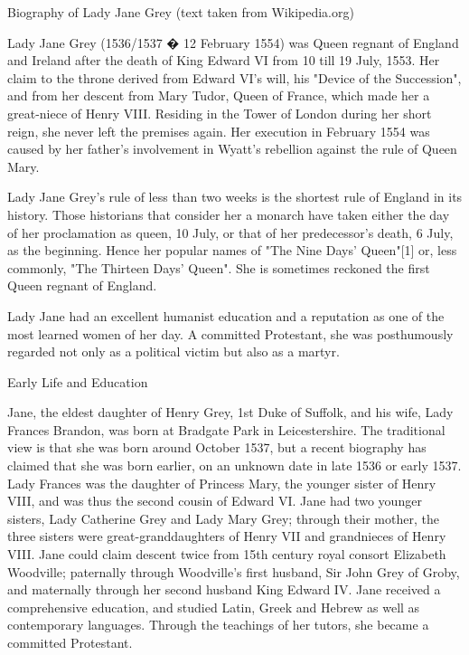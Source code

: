 \documentclass{article}
\begin{document}
Biography of Lady Jane Grey 
(text taken from Wikipedia.org)


Lady Jane Grey (1536/1537 � 12 February 1554) was Queen regnant of England and Ireland after the death of King Edward VI from 10 till 19 July, 1553. Her claim to the throne derived from Edward VI's will, his "Device of the Succession", and from her descent from Mary Tudor, Queen of France, which made her a great-niece of Henry VIII. Residing in the Tower of London during her short reign, she never left the premises again. Her execution in February 1554 was caused by her father's involvement in Wyatt's rebellion against the rule of Queen Mary.

Lady Jane Grey's rule of less than two weeks is the shortest rule of England in its history. Those historians that consider her a monarch have taken either the day of her proclamation as queen, 10 July, or that of her predecessor's death, 6 July, as the beginning. Hence her popular names of "The Nine Days' Queen"[1] or, less commonly, "The Thirteen Days' Queen". She is sometimes reckoned the first Queen regnant of England.

Lady Jane had an excellent humanist education and a reputation as one of the most learned women of her day. A committed Protestant, she was posthumously regarded not only as a political victim but also as a martyr.


Early Life and Education

Jane, the eldest daughter of Henry Grey, 1st Duke of Suffolk, and his wife, Lady Frances Brandon, was born at Bradgate Park in Leicestershire. The traditional view is that she was born around October 1537, but a recent biography has claimed that she was born earlier, on an unknown date in late 1536 or early 1537. Lady Frances was the daughter of Princess Mary, the younger sister of Henry VIII, and was thus the second cousin of Edward VI. Jane had two younger sisters, Lady Catherine Grey and Lady Mary Grey; through their mother, the three sisters were great-granddaughters of Henry VII and grandnieces of Henry VIII. Jane could claim descent twice from 15th century royal consort Elizabeth Woodville; paternally through Woodville's first husband, Sir John Grey of Groby, and maternally through her second husband King Edward IV. Jane received a comprehensive education, and studied Latin, Greek and Hebrew as well as contemporary languages. Through the teachings of her tutors, she became a committed Protestant.
\end{document}
